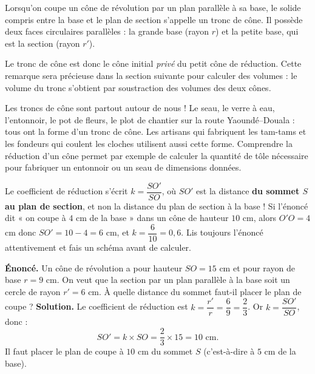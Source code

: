 \documentclass[11pt]{article}
\newcommand{\cle}[1]{{\popxbold\color{popdark}#1}}
\begin{document}
\begin{definition}
Lorsqu'on coupe un cône de révolution par un plan parallèle à sa base, le solide compris entre la base et le plan de section s'appelle un \cle{tronc de cône}. Il possède deux faces circulaires parallèles : la grande base (rayon $r$) et la petite base, qui est la section (rayon $r'$).
\end{definition}

Le tronc de cône est donc le cône initial \emph{privé} du petit cône de réduction. Cette remarque sera précieuse dans la section suivante pour calculer des volumes : le volume du tronc s'obtient par soustraction des volumes des deux cônes.

\begin{savaistu}
Les troncs de cône sont partout autour de nous ! Le seau, le verre à eau, l'entonnoir, le pot de fleurs, le plot de chantier sur la route Yaoundé--Douala : tous ont la forme d'un tronc de cône. Les artisans qui fabriquent les tam-tams et les fondeurs qui coulent les cloches utilisent aussi cette forme. Comprendre la réduction d'un cône permet par exemple de calculer la quantité de tôle nécessaire pour fabriquer un entonnoir ou un seau de dimensions données.
\end{savaistu}

\begin{attention}
Le coefficient de réduction s'écrit $k = \dfrac{SO'}{SO}$, où $SO'$ est la distance \textbf{du sommet $S$ au plan de section}, et non la distance du plan de section à la base ! Si l'énoncé dit « on coupe à $4$ cm de la base » dans un cône de hauteur $10$ cm, alors $O'O = 4$ cm donc $SO' = 10 - 4 = 6$ cm, et $k = \dfrac{6}{10} = 0,6$. Lis toujours l'énoncé attentivement et fais un schéma avant de calculer.
\end{attention}

\begin{exoresolu}
\textbf{Énoncé.} Un cône de révolution a pour hauteur $SO = 15$ cm et pour rayon de base $r = 9$ cm. On veut que la section par un plan parallèle à la base soit un cercle de rayon $r' = 6$ cm. À quelle distance du sommet faut-il placer le plan de coupe ?
\tcblower
\textbf{Solution.} Le coefficient de réduction est $k = \dfrac{r'}{r} = \dfrac{6}{9} = \dfrac{2}{3}$. Or $k = \dfrac{SO'}{SO}$, donc :
\[ SO' = k \times SO = \frac{2}{3} \times 15 = 10 \text{ cm}. \]
Il faut placer le plan de coupe à $10$ cm du sommet $S$ (c'est-à-dire à $5$ cm de la base).
\end{exoresolu}
\end{document}
